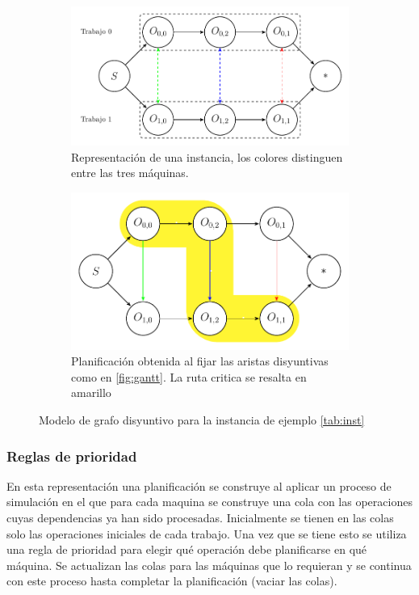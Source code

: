 \begin{figure}
    \centering
    \begin{subfigure}{.8\textwidth}
        \centering
        \includegraphics[width=.8\linewidth]{Imagenes/disyuntive.pdf}
        \caption{Representación de una instancia, los colores distinguen entre las tres máquinas.}
    \end{subfigure}
    \begin{subfigure}{.8\textwidth}
        \centering
        \includegraphics[width=.8\linewidth]{Imagenes/plandisyuntive.pdf}
        \caption{Planificación obtenida al fijar las aristas disyuntivas como en \ref{fig:gantt}. La ruta critica se resalta en amarillo}
    \end{subfigure}
\caption{Modelo de grafo disyuntivo para la instancia de ejemplo \ref{tab:inst}}
\end{figure}

\subsubsection*{Reglas de prioridad}
En esta representación una planificación se construye al aplicar un proceso de simulación en el que para cada maquina se construye una cola con las operaciones cuyas dependencias ya han sido procesadas. Inicialmente se tienen en las colas solo las operaciones iniciales de cada trabajo. Una vez que se tiene esto se utiliza una regla de prioridad para elegir qué operación debe planificarse en qué máquina. Se actualizan las colas para las máquinas que lo requieran y se continua con este proceso hasta completar la planificación (vaciar las colas).

